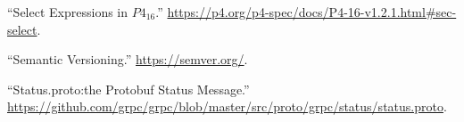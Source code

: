\documentclass[11pt]{article}
\begin{document}
{{\begin{thebibliography}{39}
\mdbibitemlabel{{}[26]}\textquotedblleft{}Select Expressions in $P4_{16}$.\textquotedblright{} \href{https://p4.org/p4-spec/docs/P4-16-v1.2.1.html\%23sec-select}{{\ttfamily https://\hspace{0pt}p4.\hspace{0pt}org/\hspace{0pt}p4-\hspace{0pt}spec/\hspace{0pt}docs/\hspace{0pt}P4-\hspace{0pt}16-\hspace{0pt}v1.\hspace{0pt}2.\hspace{0pt}1.\hspace{0pt}html\#\hspace{0pt}sec-\hspace{0pt}select}}.\label{p4selectexpr}%

\mdbibitemlabel{{}[27]}\textquotedblleft{}Semantic Versioning.\textquotedblright{} \href{https://semver.org/}{{\ttfamily https://\hspace{0pt}semver.\hspace{0pt}org/\hspace{0pt}}}.\label{semver}%

\mdbibitemlabel{{}[28]}\textquotedblleft{}Status.proto:the Protobuf Status Message.\textquotedblright{} \href{https://github.com/grpc/grpc/blob/master/src/proto/grpc/status/status.proto}{{\ttfamily https://\hspace{0pt}github.\hspace{0pt}com/\hspace{0pt}grpc/\hspace{0pt}grpc/\hspace{0pt}blob/\hspace{0pt}master/\hspace{0pt}src/\hspace{0pt}proto/\hspace{0pt}grpc/\hspace{0pt}status/\hspace{0pt}status.\hspace{0pt}proto}}.\label{protostatus}%


\end{thebibliography}}}
\end{document}
